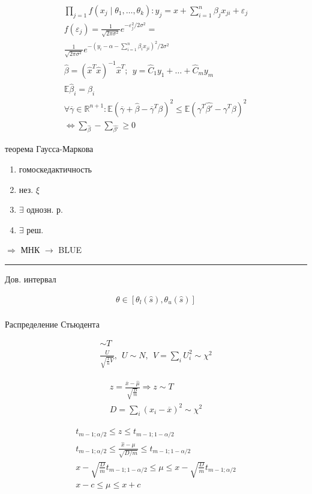 \documentclass{book}
\begin{document}
\begin{gather*}
    \prod_{j=1}^{} {f(x_j\mid \theta_1,\dots, \theta_k)}: y_j=x+\sum_{i=1}^{n} {\beta_j x_{ji}}+\varepsilon_j\\
  f(\varepsilon_j)=\frac{1}{\sqrt{2\pi\sigma^2}}e^{-\varepsilon_j^2/2\sigma^2}=\\
  \frac{1}{\sqrt{2\pi\sigma^2}}e^{-(y_i-\alpha-\sum_{i=1}^{n} {\beta_i x_{ji}})^2/2\sigma^2}\\
  \hat{\beta}=(\hat{x}^T\hat{x})^{-1}\hat{x}^T;~~
  y=\hat{C}_1 y_1+\dots+\hat{C}_m y_m\\
  \mathbb{E}\hat{\beta}_i=\beta_i\\
  \forall \overline{\gamma} \in \mathbb{R}^{n+1}:
  \mathbb{E}(\overline{\gamma}+\hat{\beta}-\overline{\gamma}^T\beta)^2\leq
  \mathbb{E}(\gamma^T \hat{\beta'}-\gamma^T\beta)^2\\
  \Leftrightarrow \sum_{\hat{\beta}} - \sum_{\hat{\beta'}} \geq 0
\end{gather*}


теорема Гаусса-Маркова
\begin{enumerate}
    \item гомоскедактичность
    \item нез. $\xi$
    \item $\exists$ однозн. р.
    \item $\exists$ реш.
\end{enumerate}
$\Rightarrow$ МНК $\rightarrow$ BLUE

\hrule
Дов. интервал

\begin{gather*}
  \theta \in [\theta_l(\hat{s}), \theta_u(\hat{s})]\\
\end{gather*}

Распределение Стьюдента

\begin{gather*}
  \sim T\\
  \frac{U}{\sqrt{\frac{1}{n}V}},~~U\sim N,~~V=\sum_{i}^{} {U_i^2}\sim \chi^2
\end{gather*}

\begin{gather*}
  z=\frac{\overline{x}-\hat{\mu}}{\sqrt{\frac{D}{m}}} \Rightarrow
  z \sim T\\
  D = \sum_{i}^{} {(x_i-\overline{x})^2} \sim \chi^2
\end{gather*}

\begin{gather*}
  t_{m-1;\alpha/2}\leq z \leq t_{m-1;1-\alpha/2}\\
  t_{m-1;\alpha/2}\leq \frac{\hat{x}-\mu}{\sqrt{D/m}} \leq t_{m-1;1-\alpha/2}\\
  x-\sqrt{\frac{D}{m}}t_{m-1;1-\alpha/2} \leq \mu \leq x- \sqrt{\frac{D}{m}}t_{m-1;\alpha/2}\\
  x-c\leq \mu \leq x + c
\end{gather*}
\end{document}

